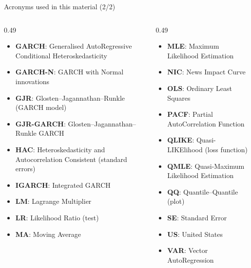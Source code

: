 \begin{frame}{Acronyms used in this material (2/2)}
\begin{columns}[T]
\begin{column}{0.49\textwidth}
\begin{itemize}\setlength{\itemsep}{0pt}
    \item \textbf{GARCH}: Generalised AutoRegressive Conditional Heteroskedasticity
    \item \textbf{GARCH-N}: GARCH with Normal innovations
    \item \textbf{GJR}: Glosten–Jagannathan–Runkle (GARCH model)
    \item \textbf{GJR-GARCH}: Glosten–Jagannathan–Runkle GARCH
    \item \textbf{HAC}: Heteroskedasticity and Autocorrelation Consistent (standard errors)
    \item \textbf{IGARCH}: Integrated GARCH
    \item \textbf{LM}: Lagrange Multiplier
    \item \textbf{LR}: Likelihood Ratio (test)
    \item \textbf{MA}: Moving Average
\end{itemize}
\end{column}
\begin{column}{0.49\textwidth}
\begin{itemize}\setlength{\itemsep}{0pt}
    \item \textbf{MLE}: Maximum Likelihood Estimation
    \item \textbf{NIC}: News Impact Curve
    \item \textbf{OLS}: Ordinary Least Squares
    \item \textbf{PACF}: Partial AutoCorrelation Function
    \item \textbf{QLIKE}: Quasi-LIKElihood (loss function)
    \item \textbf{QMLE}: Quasi-Maximum Likelihood Estimation
    \item \textbf{QQ}: Quantile–Quantile (plot)
    \item \textbf{SE}: Standard Error
    \item \textbf{US}: United States
    \item \textbf{VAR}: Vector AutoRegression
\end{itemize}
\end{column}
\end{columns}
\end{frame}

